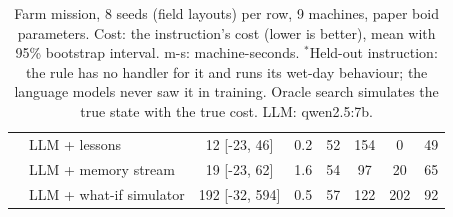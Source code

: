 \begin{table}[h!]
{\begin{tabular}{llcccccc}
 & LLM + lessons & 12 [-23, 46] & 0.2 & 52 & 154 & 0 & 49 \\
 & LLM + memory stream & 19 [-23, 62] & 1.6 & 54 & 97 & 20 & 65 \\
 & LLM + what-if simulator & 192 [-32, 594] & 0.5 & 57 & 122 & 202 & 92 \\
\hline
\end{tabular}}
\caption{Farm mission, 8 seeds (field layouts) per row, 9 machines, paper boid parameters. Cost: the instruction's cost (lower is better), mean with 95\% bootstrap interval. m-s: machine-seconds. $^*$Held-out instruction: the rule has no handler for it and runs its wet-day behaviour; the language models never saw it in training. Oracle search simulates the true state with the true cost. LLM: qwen2.5:7b.}
\label{tab:farm}
\end{table}
